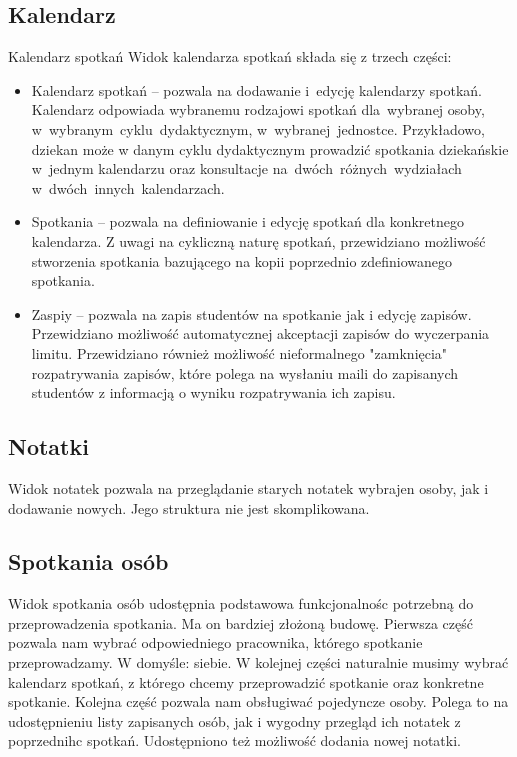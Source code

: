 \documentclass[licencjacka]{pracamgr}
\begin{document}
\subsection{Kalendarz}
Kalendarz spotkań
Widok kalendarza spotkań składa się z trzech części:

\begin{itemize}
\item Kalendarz spotkań -- pozwala na dodawanie i~edycję kalendarzy spotkań. Kalendarz odpowiada wybranemu rodzajowi spotkań dla~wybranej osoby, w~wybranym~cyklu~dydaktycznym, w~wybranej~jednostce. Przykładowo, dziekan może w danym cyklu dydaktycznym prowadzić spotkania dziekańskie w~jednym kalendarzu oraz konsultacje na~dwóch~różnych~wydziałach w~dwóch~innych~kalendarzach.
\item Spotkania -- pozwala na definiowanie i edycję spotkań dla konkretnego kalendarza. Z uwagi na cykliczną naturę spotkań, przewidziano możliwość stworzenia spotkania bazującego na kopii poprzednio zdefiniowanego spotkania.
\item Zaspiy --  pozwala na zapis studentów na spotkanie jak i edycję zapisów. Przewidziano możliwość automatycznej akceptacji zapisów do wyczerpania limitu. Przewidziano również możliwość nieformalnego "zamknięcia" rozpatrywania zapisów, które polega na wysłaniu maili do zapisanych studentów z informacją o wyniku rozpatrywania ich zapisu.
\end{itemize}

\subsection{Notatki}
Widok notatek pozwala na przeglądanie starych notatek wybrajen osoby, jak i dodawanie nowych. Jego struktura nie jest skomplikowana.

\subsection{Spotkania osób}
Widok spotkania osób udostępnia podstawowa funkcjonalnośc potrzebną do przeprowadzenia spotkania. Ma on bardziej złożoną budowę.
Pierwsza część pozwala nam wybrać odpowiedniego pracownika, którego spotkanie przeprowadzamy. W domyśle: siebie.
W kolejnej części naturalnie musimy wybrać kalendarz spotkań, z którego chcemy przeprowadzić spotkanie oraz konkretne spotkanie.
Kolejna część pozwala nam obsługiwać pojedyncze osoby. Polega to na udostępnieniu listy zapisanych osób, jak i wygodny przegląd ich notatek z poprzednihc spotkań. Udostępniono też możliwość dodania nowej notatki.
\end{document}

